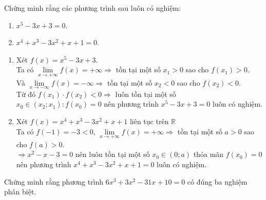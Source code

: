 \begin{bt}%
	Chứng minh rằng các phương trình sau luôn có nghiệm:
	\begin{enumerate}
		\item $x^5-3 x+3=0$.
		\item $x^4+x^3-3 x^2+x+1=0$.
	\end{enumerate}
	\loigiai
	{\begin{enumerate}
			\item Xét $f(x)=x^5-3 x+3$.\\
			Ta có
			$\lim\limits_{x \rightarrow+\infty} f(x)=+\infty \Rightarrow$ tồn tại một số $x_1>0$ sao cho $f\left(x_1\right)>0$.\\
			Và $\lim\limits_{x \rightarrow-\infty} f(x)=-\infty \Rightarrow$ tồn tại một số $x_2<0$ sao cho $f\left(x_2\right)<0$.\\
			Từ đó $f\left(x_1\right) \cdot f\left(x_2\right)<0 \Rightarrow$ luôn tồn tại một số $x_0 \in\left(x_2 ; x_1\right): f\left(x_0\right)=0$ nên phương trình $x^5-3 x+3=0$ luôn có nghiệm.
			\item Xét $f(x)=x^4+x^3-3 x^2+x+1$ liên tục trên $\mathbb{R}$\\
			Ta có $f(-1)=-3<0$,
			$\lim\limits_{x \rightarrow+\infty} f(x)=+\infty \Rightarrow$ tồn tại một số $a>0$ sao cho $f(a)>0$.\\
			$\Rightarrow x^2-x-3=0$ nên luôn tồn tại một số $x_0 \in(0 ; a)$ thỏa mãn $f\left(x_0\right)=0$ nên phương trình $x^4+x^3-3 x^2+x+1=0$ luôn có nghiệm.	
		\end{enumerate}
	}
\end{bt}

\begin{ex}%
	Chứng minh rằng phương trình $6x^3+3x^2-31x+10=0$ có đúng  ba nghiệm phân biệt.
\end{ex}


